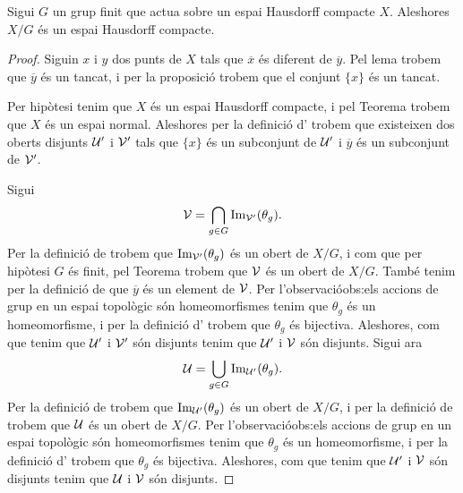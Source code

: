 \documentclass[../../Main.tex]{subfiles}
\begin{document}
	\begin{theorem}
		\label{thm:el quocient d'un Hausdorff compacte per un grup finit és Hausdorff compacte}
		Sigui \(G\) un grup finit que actua sobre un espai Hausdorff compacte \(X\). Aleshores \(X/G\) és un espai Hausdorff compacte.
		\begin{proof} %
			Siguin \(x\) i \(y\) dos punts de \(X\) tals que \(\overline{x}\) és diferent de \(\overline{y}\). Pel lema  trobem que \(\overline{y}\) és un tancat, i per la proposició  trobem que el conjunt \(\{x\}\) és un tancat.
			
			Per hipòtesi tenim que \(X\) és un espai Hausdorff compacte, i pel Teorema  trobem que \(X\) és un espai normal. Aleshores per la definició d' trobem que existeixen dos oberts disjunts \(\mathcal{U}'\) i \(\mathcal{V}'\) tals que \(\{x\}\) és un subconjunt de \(\mathcal{U}'\) i \(\overline{y}\) és un subconjunt de \(\mathcal{V}'\).
			
			Sigui
			\[
			    \mathcal{V}=\bigcap_{g\in G}\operatorname{Im}_{\mathcal{V}'}(\theta_{g}).
			\]
			Per la definició de  trobem que \(\operatorname{Im}_{\mathcal{V}'}(\theta_{g})\) és un obert de \(X/G\), i com que per hipòtesi \(G\) és finit, pel Teorema  trobem que \(\mathcal{V}\) és un obert de \(X/G\). També tenim per la definició de  que \(\overline{y}\) és un element de \(\mathcal{V}\). Per l'observació{obs:els accions de grup en un espai topològic són homeomorfismes} tenim que \(\theta_{g}\) és un homeomorfisme, i per la definició d' trobem que \(\theta_{g}\) és bijectiva. Aleshores, com que tenim que \(\mathcal{U}'\) i \(\mathcal{V}'\) són disjunts tenim que \(\mathcal{U}'\) i \(\mathcal{V}\) són disjunts. Sigui ara
			\[
			    \mathcal{U}=\bigcup_{g\in G}\operatorname{Im}_{\mathcal{U}'}(\theta_{g}).
			\]
			Per la definició de  trobem que \(\operatorname{Im}_{\mathcal{U}'}(\theta_{g})\) és un obert de \(X/G\), i per la definició de  trobem que \(\mathcal{U}\) és un obert de \(X/G\). Per l'observació{obs:els accions de grup en un espai topològic són homeomorfismes} tenim que \(\theta_{g}\) és un homeomorfisme, i per la definició d' trobem que \(\theta_{g}\) és bijectiva. Aleshores, com que tenim que \(\mathcal{U}'\) i \(\mathcal{V}\) són disjunts tenim que \(\mathcal{U}\) i \(\mathcal{V}\) són disjunts.
			

\end{proof}
\end{theorem}
\end{document}
